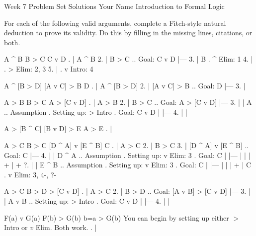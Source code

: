 

\heading
Week 7 Problem Set Solutions
Your Name
Introduction to Formal Logic
\endheading

For each of the following valid arguments, complete a Fitch-style natural deduction to prove its validity. Do this by filling in the missing lines, citations, or both.

\problems
{}
\argument
 A ^ B
 B > C
\argumentline
 C v D
\endargument
	\answer
	. | A ^ B
	 2. | B > C  ..  Goal: C v D
	    |---
	 3. | B      .  ^ Elim: 1
	 4. |        .  > Elim: 2, 3
	 5. |        .  v Intro: 4
	\endfitchproof
	\endanswer

\argument
 A ^ [B > D]
 [A v C] > B
\argumentline
 D
\endargument
	\answer
	. | A ^ [B > D]
	 2. | [A v C] > B  ..  Goal: D
	    |---
	 3. | 
	\endfitchproof
	\endanswer

\argument
 A > B
 B > C
\argumentline
 A > [C v D]
\endargument
	\answer
	. | A > B
	 2. | B > C        ..  Goal: A > [C v D]
	    |---
	 3. |   | A        ..  Assumption  .  Setting up: > Intro  .  Goal: C v D
	    |   |---
	 4. |   | 
	\endfitchproof
	\endanswer

\argument
 A > [B ^ C]
 [B v D] > E
\argumentline
 A > E
\endargument
	\answer
	. | 
	\endfitchproof
	\endanswer

\widerfitchsetup %
\argument
 A > C
 B > C
 [D ^ A] v [E ^ B]
\argumentline
 C
\endargument
	\answer
	. | A > C
	 2. | B > C
	 3. | [D ^ A] v [E ^ B]  ..  Goal: C
	    |---
	 4. |   | D ^ A  ..  Assumption  .  Setting up: v Elim: 3  .  Goal: C
	    |   |---
	    |   | 
	    |   +
	    |   +
	 ?. |   | E ^ B  ..  Assumption  .  Setting up: v Elim: 3  .  Goal: C
	    |   |---
	    |   | 
	    |   +
	    | C          .  v Elim: 3, 4-, ?-
	\endfitchproof
	\endanswer

\argument
 A > C
 B > D
\argumentline
 [A v B] > [C v D]
\endargument
	\answer
	. | A > C
	 2. | B > D          ..  Goal: [A v B] > [C v D]
	    |---
	 3. |   | A v B      ..  Setting up: > Intro    .  Goal: C v D
	    |   |---
	 4. |   | 
	\endfitchproof
	\endanswer

\argument
 F(a) v G(a)
 F(b) > G(b)
\argumentline
 b=a > G(b)
\endargument
\Hint You can begin by setting up either $>$ Intro or $v$ Elim. Both work.
	\answer
	. | 
	\endfitchproof
	\endanswer

